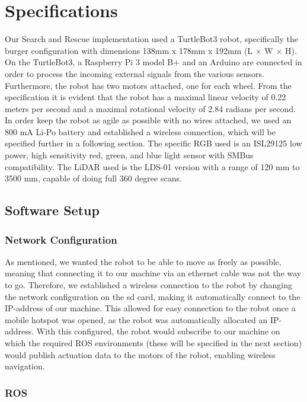 \documentclass[conference]{IEEEtran}
\begin{document}
\section{Specifications}
Our Search and Rescue implementation used a TurtleBot3 robot, specifically the burger configuration with dimensions 138mm x 178mm x 192mm (L $\times$ W $\times$ H)\cite{b1}.
On the TurtleBot3, a Raspberry Pi 3 model B+ and an Arduino are connected in order to process the incoming external signals from the various sensors.
Furthermore, the robot has two motors attached, one for each wheel. From the specification it is evident that the robot has a maximal linear velocity of 0.22 meters per second
and a maximal rotational velocity of 2.84 radians per second. In order keep the robot as agile as possible with no wires attached, we used an 800 mA Li-Po battery and established a wireless connection, which will be specified further in a following section.
The specific RGB used is an ISL29125 low power, high sensitivity red, green, and blue light sensor with SMBus compatibility\cite{b2}.
The LiDAR used is the LDS-01 version with a range of 120 mm to 3500 mm, capable of doing full 360 degree scans. \cite{b3}

\subsection{Software Setup}

\subsubsection{Network Configuration}
As mentioned, we wanted the robot to be able to move as freely as possible, meaning that connecting it to our machine via an ethernet cable was not the way to go.
Therefore, we established a wireless connection to the robot by changing the network configuration on the sd card, making it automatically connect to the IP-address of our machine.
This allowed for easy connection to the robot once a mobile hotspot was opened, as the robot was automatically allocated an IP-address.
With this configured, the robot would subscribe to our machine on which the required ROS environments (these will be specified in the next section) would publish actuation data to the motors of the robot, enabling wireless navigation.

\subsubsection{ROS}
\end{document}
